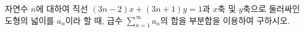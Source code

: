자연수 $n$에 대하여 직선 $(3n-2)x+(3n+1)y=1$과 $x$축 및 $y$축으로 둘러싸인 도형의 넓이를 $a_n$이라 할 때, 급수 $\displaystyle\sum_{n=1}^{\infty}a_n$의 합을 부분합을 이용하여 구하시오.
